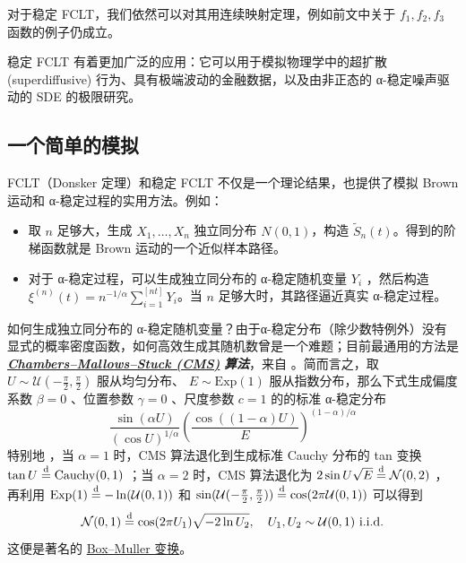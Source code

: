 对于稳定 FCLT，我们依然可以对其用连续映射定理，例如前文中关于 $f_1,f_2,f_3$ 函数的例子仍成立。

稳定 FCLT 有着更加广泛的应用：它可以用于模拟物理学中的超扩散 (superdiffusive) 行为、具有极端波动的金融数据，以及由非正态的 α-稳定噪声驱动的 SDE 的极限研究。%


\subsection{一个简单的模拟}

FCLT（Donsker 定理）和稳定 FCLT 不仅是一个理论结果，也提供了模拟 Brown 运动和 α-稳定过程的实用方法。例如：

\begin{itemize}
\tightlist
\item
  取 $n$ 足够大，生成 $X_1,\dots,X_n$ 独立同分布 $N(0,1)$，构造 $\widetilde S_n(t)$。得到的阶梯函数就是 Brown 运动的一个近似样本路径。
\item
  对于 α-稳定过程，可以生成独立同分布的 α-稳定随机变量 $Y_i$ ，然后构造 $\xi^{(n)}(t) = n^{-1/\alpha} \sum_{i=1}^{[nt]} Y_i$。当 $n$ 足够大时，其路径逼近真实 α-稳定过程。
\end{itemize}

如何生成独立同分布的 α-稳定随机变量？由于α-稳定分布（除少数特例外）没有显式的概率密度函数，如何高效生成其随机数曾是一个难题；目前最通用的方法是 \emph{\textbf{\href{https://en.wikipedia.org/wiki/Stable_distribution\#Simulation_of_stable_variates}{Chambers--Mallows--Stuck (CMS)}} } \textbf{\emph{算法}}，来自 \cite{chambers1976}。简而言之，取 $U\sim\mathcal U\left(-\tfrac\pi2,\tfrac\pi2\right)$ 服从均匀分布、 $E\sim\mathrm{Exp}(1)$ 服从指数分布，那么下式生成偏度系数 $\beta=0$ 、位置参数 $\gamma=0$ 、尺度参数 $c=1$ 的的标准 α-稳定分布
\[\frac{\sin(\alpha U)}{(\cos U)^{1/\alpha}}\left(\frac{\cos((1-\alpha)U)}{E}\right)^{(1-\alpha)/\alpha}\]
特别地 ，当 $\alpha=1$ 时，CMS 算法退化到生成标准 Cauchy 分布的 tan 变换 $\tan U\overset{\rm d}=\mathrm{Cauchy}(0,1)$ ；当 $\alpha=2$ 时，CMS 算法退化为 $2\sin U\sqrt{E}\overset{\rm d}=\mathcal N(0,2)$ ，再利用 $\mathrm{Exp}(1)\overset{\rm d}=-\ln (\mathcal U(0,1))$ 和 $\sin(\mathcal U(-\tfrac\pi2,\tfrac \pi2))\overset{\rm d}=\cos(2\pi\mathcal U(0,1))$ 可以得到
\[\mathcal N(0,1)\overset{\rm d}=\cos(2\pi U_1)\sqrt{-2\ln U_2},\quad  U_1,U_2\sim\mathcal U(0,1)\text{ i.i.d.}\]
这便是著名的 \href{https://en.wikipedia.org/wiki/Box\%E2\%80\%93Muller_transform}{Box--Muller 变换}。

